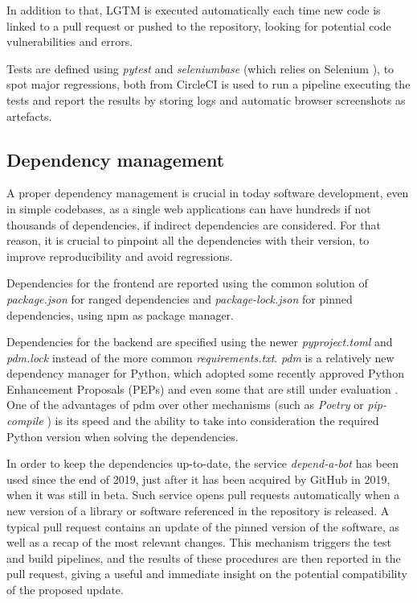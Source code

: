 \documentclass{Configuration_Files/PoliMi3i_thesis}
\begin{document}
In addition to that, LGTM \cite{LGTMContinuousSecurity} is executed automatically each time new code is linked to a pull request or pushed to the repository, looking for potential code vulnerabilities and errors.

Tests are defined using \textit{pytest} \cite{PytestdevPytest2022} and \textit{seleniumbase} \cite{SeleniumbaseSeleniumBase2022} (which relies on Selenium \cite{Selenium}), to spot major regressions, both from  CircleCI \cite{ContinuousIntegrationDelivery} is used to run a pipeline executing the tests and report the results by storing logs and automatic browser screenshots as artefacts.

\subsection{Dependency management}

A proper dependency management is crucial in today software development, even in simple codebases, as a single web applications can have hundreds if not thousands of dependencies, if indirect dependencies are considered. For that reason, it is crucial to pinpoint all the dependencies with their version, to improve reproducibility and avoid regressions.

Dependencies for the frontend are reported using the common solution of \textit{package.json} for ranged dependencies and \textit{package-lock.json} for pinned dependencies, using npm \cite{NpmJavaScriptPackage2022} as package manager.

Dependencies for the backend are specified using the newer \textit{pyproject.toml} \cite{PEP621Storing} and \textit{pdm.lock} instead of the more common \textit{requirements.txt}. \textit{pdm} \cite{PDMPythonDevelopment2022} is a relatively new dependency manager for Python, which adopted some recently approved Python Enhancement Proposals (PEPs) \cite{PEP621Storing, PEP517Buildsystem} and even some that are still under evaluation \cite{PEP582Python}. One of the advantages of pdm over other mechanisms (such as \textit{Poetry} \cite{PoetryDependencyManagement2022} or \textit{pip-compile} \cite{JazzbandPiptools2022}) is its speed and the ability to take into consideration the required Python version when solving the dependencies.

In order to keep the dependencies up-to-date, the service \textit{depend-a-bot} \cite{Dependabot} has been used since the end of 2019, just after it has been acquired by GitHub in 2019, when it was still in beta.
Such service opens pull requests automatically when a new version of a library or software referenced in the repository is released. A typical pull request contains an update of the pinned version of the software, as well as a recap of the most relevant changes. This mechanism triggers the test and build pipelines, and the results of these procedures are then reported in the pull request, giving a useful and immediate insight on the potential compatibility of the proposed update.
\end{document}
